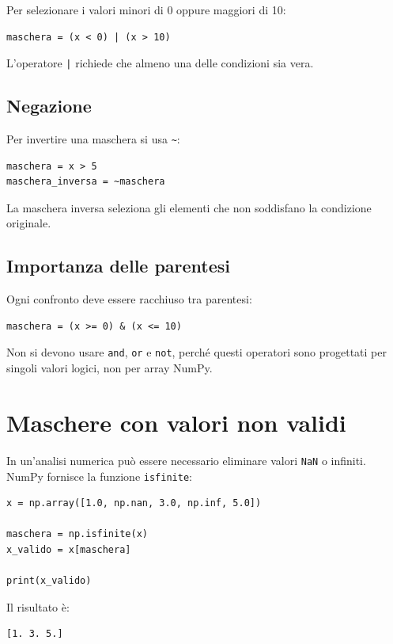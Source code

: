 \documentclass[11pt,a4paper]{book}
\begin{document}
Per selezionare i valori minori di 0 oppure maggiori di 10:

\begin{lstlisting}
maschera = (x < 0) | (x > 10)
\end{lstlisting}

L'operatore \texttt{|} richiede che almeno una delle condizioni sia vera.

\subsection{Negazione}

Per invertire una maschera si usa \texttt{\textasciitilde}:

\begin{lstlisting}
maschera = x > 5
maschera_inversa = ~maschera
\end{lstlisting}

La maschera inversa seleziona gli elementi che non soddisfano la condizione originale.

\subsection{Importanza delle parentesi}

Ogni confronto deve essere racchiuso tra parentesi:

\begin{lstlisting}
maschera = (x >= 0) & (x <= 10)
\end{lstlisting}

Non si devono usare \texttt{and}, \texttt{or} e \texttt{not}, perché questi operatori sono progettati per singoli valori logici, non per array NumPy.

\section{Maschere con valori non validi}

In un'analisi numerica può essere necessario eliminare valori \texttt{NaN} o infiniti. NumPy fornisce la funzione \texttt{isfinite}:

\begin{lstlisting}
x = np.array([1.0, np.nan, 3.0, np.inf, 5.0])

maschera = np.isfinite(x)
x_valido = x[maschera]

print(x_valido)
\end{lstlisting}

Il risultato è:

\begin{lstlisting}
[1. 3. 5.]
\end{lstlisting}
\end{document}
